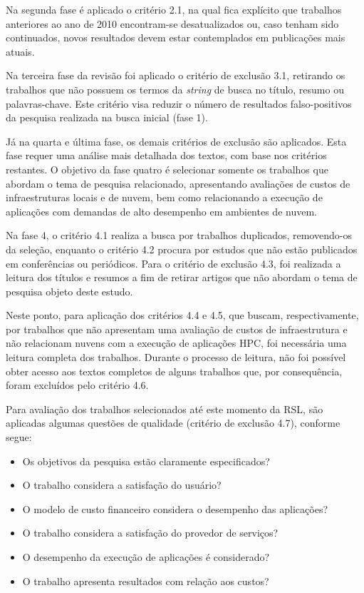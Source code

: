 \documentclass[tese,capa]{texufpel}
\begin{document}
Na segunda fase é aplicado o critério 2.1, na qual fica explícito que trabalhos anteriores ao ano de 2010 encontram-se desatualizados ou, caso tenham sido continuados, novos resultados devem estar contemplados em publicações mais atuais.

Na terceira fase da revisão foi aplicado o critério de exclusão 3.1, retirando os trabalhos que não possuem os termos da \emph{string} de busca no título, resumo ou palavras-chave. Este critério visa reduzir o número de resultados falso-positivos da pesquisa realizada na busca inicial (fase 1).

Já na quarta e última fase, os demais critérios de exclusão são aplicados. Esta fase requer uma análise mais detalhada dos textos, com base nos critérios restantes. O objetivo da fase quatro é selecionar somente os trabalhos que abordam o tema de pesquisa relacionado, apresentando avaliações de custos de infraestruturas locais e de nuvem, bem como relacionando a execução de aplicações com demandas de alto desempenho em ambientes de nuvem.

Na fase 4, o critério 4.1 realiza a busca por trabalhos duplicados, removendo-os da seleção, enquanto o critério 4.2 procura por estudos que não estão publicados em conferências ou periódicos. Para o critério de exclusão 4.3, foi realizada a leitura dos títulos e resumos a fim de retirar artigos que não abordam o tema de pesquisa objeto deste estudo.

Neste ponto, para aplicação dos critérios 4.4 e 4.5, que buscam, respectivamente, por trabalhos que não apresentam uma avaliação de custos de infraestrutura e não relacionam nuvens com a execução de aplicações HPC, foi necessária uma leitura completa dos trabalhos. Durante o processo de leitura, não foi possível obter acesso aos textos completos de alguns trabalhos que, por consequência, foram excluídos pelo critério 4.6.

Para avaliação dos trabalhos selecionados até este momento da RSL, são aplicadas algumas questões de qualidade (critério de exclusão 4.7), conforme segue:

\begin{itemize}
  \item Os objetivos da pesquisa estão claramente especificados?
  \item O trabalho considera a satisfação do usuário?
  \item O modelo de custo financeiro considera o desempenho das aplicações?
  \item O trabalho considera a satisfação do provedor de serviços?
  \item O desempenho da execução de aplicações é considerado?
  \item O trabalho apresenta resultados com relação aos custos?
\end{itemize}
\end{document}
